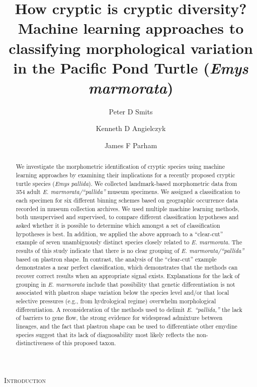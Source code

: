 \documentclass[12pt,letterpaper]{article}
\title{How cryptic is cryptic diversity? Machine learning approaches to classifying morphological variation in the Pacific Pond Turtle (\textit{Emys marmorata})}
\author[1]{Peter D Smits}%
\author[1,2]{Kenneth D Angielczyk}%
\author[3]{James F Parham}%
\affil[1]{Committee on Evolutionary Biology, University of Chicago}
\affil[2]{Integrative Research Center, Field Museum of Natural History}
\affil[3]{Department of Geological Sciences, California State University -- Fullerton}
\renewcommand{\section}[1]{%
\bigskip
\begin{center}
\begin{Large}
\normalfont\scshape #1
\medskip
\end{Large}
\end{center}}
\begin{document}
\maketitle
{}

\linenumbers
\modulolinenumbers[2]

\begin{abstract}
  We investigate the morphometric identification of cryptic species using machine learning approaches by examining their implications for a recently proposed cryptic turtle species (\textit{Emys pallida}). We collected landmark-based morphometric data from 354 adult \textit{E. marmorata/``pallida''} museum specimens. We assigned a classification to each specimen for six different binning schemes based on geographic occurrence data recorded in museum collection archives. We used multiple machine learning methods, both unsupervised and supervised, to compare different classification hypotheses and asked whether it is possible to determine which amongst a set of classification hypotheses is best. In addition, we applied the above approach to a “clear-cut” example of seven unambiguously distinct species closely related to \textit{E. marmorata}. The results of this study indicate that there is no clear grouping of \textit{E. marmorata/``pallida''} based on plastron shape. In contrast, the analysis of the ``clear-cut'' example demonstrates a near perfect classification, which demonstrates that the methods can recover correct results when an appropriate signal exists. Explanations for the lack of grouping in \textit{E. marmorata} include that possibility that genetic differentiation is not associated with plastron shape variation below the species level and/or that local selective pressures (e.g., from hydrological regime) overwhelm morphological differentiation. A reconsideration of the methods used to delimit \textit{E. ``pallida,''} the lack of barriers to gene flow, the strong evidence for widespread admixture between lineages, and the fact that plastron shape can be used to differentiate other emydine species suggest that its lack of diagnosability most likely reflects the non-distinctiveness of this proposed taxon.
\end{abstract}

\section{Introduction}
\end{document}

